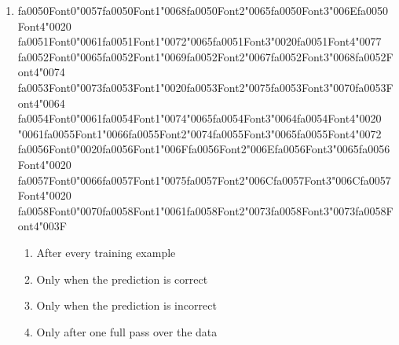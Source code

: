 \documentclass[12pt]{article}
\begin{document}
\begin{enumerate}[label=Q\arabic*.]
\item {\csname fa0050Font0\endcsname\char"0057}{\csname fa0050Font1\endcsname\char"0068}{\csname fa0050Font2\endcsname\char"0065}{\csname fa0050Font3\endcsname\char"006E}{\csname fa0050Font4\endcsname\char"0020} {\csname fa0051Font0\endcsname\char"0061}{\csname fa0051Font1\endcsname\char"0072}{\char"0065}{\csname fa0051Font3\endcsname\char"0020}{\csname fa0051Font4\endcsname\char"0077} {\csname fa0052Font0\endcsname\char"0065}{\csname fa0052Font1\endcsname\char"0069}{\csname fa0052Font2\endcsname\char"0067}{\csname fa0052Font3\endcsname\char"0068}{\csname fa0052Font4\endcsname\char"0074} {\csname fa0053Font0\endcsname\char"0073}{\csname fa0053Font1\endcsname\char"0020}{\csname fa0053Font2\endcsname\char"0075}{\csname fa0053Font3\endcsname\char"0070}{\csname fa0053Font4\endcsname\char"0064} {\csname fa0054Font0\endcsname\char"0061}{\csname fa0054Font1\endcsname\char"0074}{\char"0065}{\csname fa0054Font3\endcsname\char"0064}{\csname fa0054Font4\endcsname\char"0020} {\char"0061}{\csname fa0055Font1\endcsname\char"0066}{\csname fa0055Font2\endcsname\char"0074}{\csname fa0055Font3\endcsname\char"0065}{\csname fa0055Font4\endcsname\char"0072} {\csname fa0056Font0\endcsname\char"0020}{\csname fa0056Font1\endcsname\char"006F}{\csname fa0056Font2\endcsname\char"006E}{\csname fa0056Font3\endcsname\char"0065}{\csname fa0056Font4\endcsname\char"0020} {\csname fa0057Font0\endcsname\char"0066}{\csname fa0057Font1\endcsname\char"0075}{\csname fa0057Font2\endcsname\char"006C}{\csname fa0057Font3\endcsname\char"006C}{\csname fa0057Font4\endcsname\char"0020} {\csname fa0058Font0\endcsname\char"0070}{\csname fa0058Font1\endcsname\char"0061}{\csname fa0058Font2\endcsname\char"0073}{\csname fa0058Font3\endcsname\char"0073}{\csname fa0058Font4\endcsname\char"003F}
\begin{enumerate}[label=(\Alph*)]
    \item After every training example
    \item Only when the prediction is correct
    \item Only when the prediction is incorrect
    \item Only after one full pass over the data
\end{enumerate}

\end{enumerate}
\end{document}
